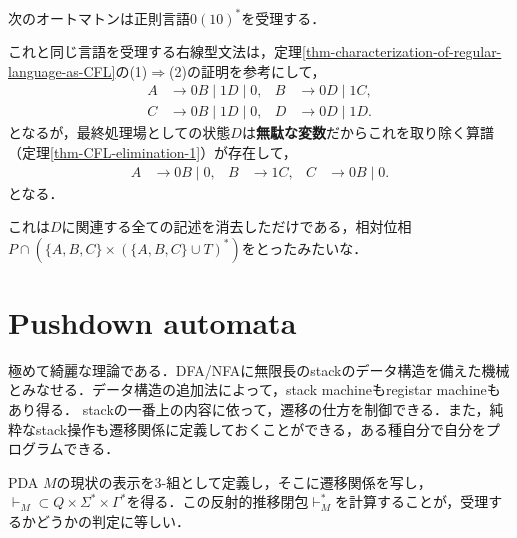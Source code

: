 \documentclass[uplatex, dvipdfmx]{jsreport}
\begin{document}
\begin{example}[DFAを右線型文法へ翻訳する]
    次のオートマトンは正則言語$0(10)^*$を受理する．
    \begin{center}\end{center}
    これと同じ言語を受理する右線型文法は，定理\ref{thm-characterization-of-regular-language-as-CFL}の(1)$\Rightarrow$(2)の証明を参考にして，
    \begin{align*}
        A&\to 0B\mid 1D\mid 0,&B&\to 0D\mid 1C,\\
        C&\to 0B\mid 1D\mid 0,&D&\to 0D\mid 1D.
    \end{align*}
    となるが，最終処理場としての状態$D$は\textbf{無駄な変数}だからこれを取り除く算譜（定理\ref{thm-CFL-elimination-1}）が存在して，
    \begin{align*}
        A&\to 0B\mid 0,&B&\to 1C,&
        C&\to 0B\mid 0.
    \end{align*}
    となる．
\end{example}
\begin{remarks}
    これは$D$に関連する全ての記述を消去しただけである，相対位相$P\cap(\{A,B,C\}\times(\{A,B,C\}\cup T)^*)$をとったみたいな．
\end{remarks}

\section{Pushdown automata}

\begin{tcolorbox}[colframe=ForestGreen, colback=ForestGreen!10!white, breakable]
    極めて綺麗な理論である．DFA/NFAに無限長のstackのデータ構造を備えた機械とみなせる．データ構造の追加法によって，stack machineもregistar machineもあり得る．
    stackの一番上の内容に依って，遷移の仕方を制御できる．また，純粋なstack操作も遷移関係に定義しておくことができる，ある種自分で自分をプログラムできる．
    
    PDA $M$の現状の表示を3-組として定義し，そこに遷移関係を写し，$\vdash_M\subset Q\times\Sigma^*\times\Gamma^*$を得る．この反射的推移閉包$\vdash_M^*$を計算することが，受理するかどうかの判定に等しい．
\end{tcolorbox}
\end{document}
